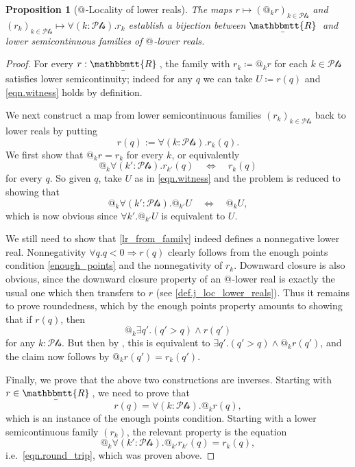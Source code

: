 \documentclass[11pt, oneside, article]{memoir}
\makeatletter
\theoremstyle{plain}
\newtheorem{proposition}[theorem]{Proposition}
\theoremstyle{definition}
\theoremstyle{remark}
\newcommand{\ubar}[1]{\underaccent{\bar}{#1}}
\newcommand{\internal}[1]{\raisebox{-.03ex}{$\mathbbmtt{#1}$}}
\newcommand{\hs}{\hspace{1.1pt}}
\newcommand{\trr}{\internal{R}\hs}
\newcommand{\tlrr}{\ubar{\trr}\hs}
\newcommand{\pt}{k}				%
\newcommand{\Pts}{\mathcal{Pts}}		%
\newcommand{\AtSymbol}{{@}}
\newcommand{\At}[1][\pt]{\AtSymbol_{#1}}
\newcommand{\imp}{\Rightarrow}
\makeatother
\begin{document}
\begin{proposition}[{$\At[]$-Locality of lower reals}]
	\label{prop:LR_locality}
	The maps $r \mapsto (\At r)_{\pt\in\Pts}$ and $(r_\pt)_{\pt\in\Pts}\mapsto \forall(\pt:\Pts).r_k$ establish a bijection between $\tlrr$ and lower semicontinuous families of $\At[]$-lower reals.
\end{proposition}

\begin{proof}
	For every $r : \tlrr$, the family with $r_\pt\coloneqq \At r$ for each $k\in\Pts$ satisfies lower semicontinuity; indeed for any $q$ we can take $U\coloneqq r(q)$ and \eqref{eqn.witness} holds by definition.

	We next construct a map from lower semicontinuous families $(r_\pt)_{\pt\in\Pts}$ back to lower reals by putting
	\begin{equation}
		\label{lr_from_family}
		r(q) := \forall (\pt : \Pts) . r_\pt(q).
	\end{equation}
	We first show that $\At r = r_\pt$ for every $\pt$, or equivalently
	\[
		\At \forall (\pt':\Pts) . r_{\pt'}(q) \quad \Longleftrightarrow \quad r_\pt(q)
	\]
	for every $q$. So given $q$, take $U$ as in \eqref{eqn.witness} and the problem is reduced to showing that
	\begin{equation}\label{eqn.round_trip}
		\At \forall (\pt':\Pts) . \At[\pt'] U \quad \Longleftrightarrow \quad \At U,
	\end{equation}
	which is now obvious since $\forall \pt' . \At[\pt'] U$ is equivalent to $U$.

	We still need to show that \eqref{lr_from_family} indeed defines a nonnegative lower real. Nonnegativity $\forall q. q<0\imp r(q)$ clearly follows from the enough points condition \cref{enough_points} and the nonnegativity of $r_\pt$. Downward closure is also obvious, since the downward closure property of an $\At[]$-lower real is exactly the usual one which then transfers to $r$ (see \cref{def.j_loc_lower_reals}). Thus it remains to prove roundedness, which by the enough points property amounts to showing that if $r(q)$, then 
	\[
		\At \exists q'. (q' > q) \wedge r(q')
	\]
	for any $\pt : \Pts$. But then by , this is equivalent to $\exists q'. (q' > q)\wedge \At r(q')$, and the claim now follows by $\At r(q') = r_\pt(q')$.

	Finally, we prove that the above two constructions are inverses. Starting with $r \in \tlrr$, we need to prove that
	\[
		r(q) = \forall (\pt : \Pts) . \At r(q),
	\]
	which is an instance of the enough points condition. Starting with a lower semicontinuous family $(r_\pt)$, the relevant property is the equation
	\[
		\At \forall (\pt' : \Pts) . \At[\pt'] r_{\pt'}(q) = r_\pt(q),
	\]
	i.e.\ \eqref{eqn.round_trip}, which was proven above.
\end{proof}
\end{document}
